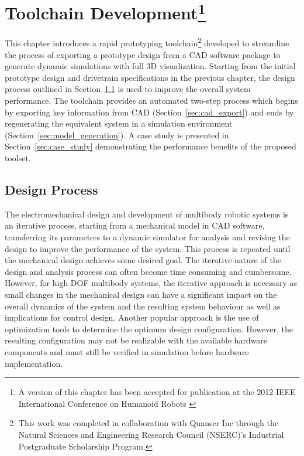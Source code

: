 \chapter[Toolchain Development]{Toolchain Development\footnote{A version of this chapter has been accepted for publication at the 2012 IEEE International Conference on Humanoid Robots \cite{ChoudhuryHumanoids2012}}} %
\label{cha:toolchain}

This chapter introduces a rapid prototyping toolchain\footnote{This work was completed in collaboration with Quanser Inc through the Natural Sciences and Engineering Research Council (NSERC)'s Industrial Postgraduate Scholarship Program.} developed to streamline the process of exporting a prototype design from a CAD software package to generate dynamic simulations with full 3D visualization. Starting from the initial prototype design and drivetrain specifications in the previous chapter, the design process outlined in Section~\ref{sec:design_process} is used to improve the overall system performance. The toolchain provides an automated two-step process which begins by exporting key information from CAD (Section~\ref{sec:cad_export}) and ends by regenerating the equivalent system in a simulation environment (Section~\ref{sec:model_generation}). A case study is presented in Section~\ref{sec:case_study} demonstrating the performance benefits of the proposed toolset. 

\section{Design Process} %
\label{sec:design_process}

The electromechanical design and development of multibody robotic systems is an iterative process, starting from a mechanical model in CAD software, transferring its parameters to a dynamic simulator for analysis and revising the design to improve the performance of the system. This process is repeated until the mechanical design achieves some desired goal. The iterative nature of the design and analysis process can often become time consuming and cumbersome. However, for high DOF multibody systems, the iterative approach is necessary as small changes in the mechanical design can have a significant impact on the overall dynamics of the system and the resulting system behaviour as well as implications for control design. Another popular approach is the use of optimization tools \cite{Paul2001,Wollherr2002} to determine the optimum design configuration. However, the resulting configuration may not be realizable with the available hardware components and must still be verified in simulation before hardware implementation. 

